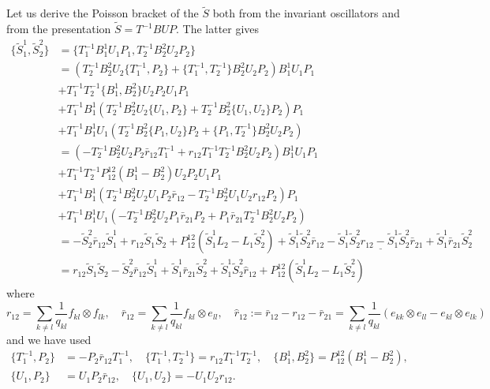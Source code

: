 \documentclass[11pt]{report}
\theoremstyle{definition}
\theoremstyle{remark}
\theoremstyle{remark}
\begin{document}
Let us derive the Poisson bracket of the $\tilde S$ both from the invariant oscillators and from the presentation $\tilde S = T^{-1}BUP$. The latter gives
\begin{align*}
\{ \tilde S_1^1, \tilde S_2^2 \}
&= \{ T_1^{-1} B_1^1 U_1 P_1, T_2^{-1} B_2^2 U_2 P_2 \} \\
&= (T_2^{-1} B_2^2 U_2 \{ T_1^{-1}, P_2 \} + \{ T_1^{-1}, T_2^{-1} \} B_2^2 U_2 P_2) B_1^1 U_1 P_1 \\
&+ T_1^{-1} T_2^{-1} \{ B_1^1, B_2^2 \} U_2 P_2 U_1 P_1 \\
&+ T_1^{-1} B_1^1 (T_2^{-1} B_2^2 U_2 \{ U_1, P_2 \} + T_2^{-1} B_2^2 \{ U_1, U_2 \} P_2) P_1 \\
&+ T_1^{-1} B_1^1 U_1 (T_2^{-1} B_2^2 \{ P_1, U_2 \} P_2 + \{ P_1, T_2^{-1} \} B_2^2 U_2 P_2) \\
&= (-T_2^{-1} B_2^2 U_2 P_2 \bar r_{12} T_1^{-1} + r_{12} T_1^{-1} T_2^{-1} B_2^2 U_2 P_2) B_1^1 U_1 P_1 \\
&+ T_1^{-1} T_2^{-1} P_{12}^{12} (B_1^1 - B_2^2) U_2 P_2 U_1 P_1 \\
&+ T_1^{-1} B_1^1 (T_2^{-1} B_2^2 U_2 U_1 P_2 \bar r_{12} - T_2^{-1} B_2^2 U_1 U_2 r_{12} P_2) P_1 \\
&+ T_1^{-1} B_1^1 U_1 (-T_2^{-1} B_2^2 U_2 P_1 \bar r_{21} P_2 + P_1 \bar r_{21} T_2^{-1} B_2^2 U_2 P_2) \\
&= - \tilde S_2^2 \bar r_{12} \tilde S_1^1 + r_{12} \tilde S_1 \tilde S_2 + P_{12}^{12} (\tilde S_1^1 L_2-L_1 \tilde S_2^2) + \underline{\tilde S_1^1 \tilde S_2^2 \bar r_{12} - \tilde S_1^1 \tilde S_2^2 r_{12} - \tilde S_1^1 \tilde S_2^2 \bar r_{21} + \tilde S_1^1 \bar r_{21} \tilde S_2^2} \\
&= r_{12} \tilde S_1 \tilde S_2 - \tilde S_2^2 \bar r_{12} \tilde S_1^1 + \tilde S_1^1 \bar r_{21} \tilde S_2^2 + \tilde S_1^1 \tilde S_2^2 \hat r_{12} + P_{12}^{12} (\tilde S_1^1 L_2-L_1 \tilde S_2^2)
\end{align*}
where
\begin{equation*}
r_{12} = \sum_{k \neq l} \frac{1}{q_{kl}} f_{kl} \otimes f_{lk}, \quad \bar r_{12} = \sum_{k \neq l} \frac{1}{q_{kl}} f_{kl} \otimes e_{ll}, \quad \hat r_{12} := \bar r_{12} - r_{12} - \bar r_{21} = \sum_{k \neq l} \frac{1}{q_{kl}} (e_{kk} \otimes e_{ll}-e_{kl} \otimes e_{lk})
\end{equation*}
and we have used
\begin{align*}
\{ T_1^{-1},P_2 \} &= -P_2 \bar r_{12} T_1^{-1}, \quad \{ T_1^{-1}, T_2^{-1} \} = r_{12} T_1^{-1} T_2^{-1}, \quad \{ B_1^1,B_2^2 \} = P_{12}^{12} (B_1^1-B_2^2), \\
\{ U_1,P_2 \} &= U_1 P_2 \bar r_{12}, \quad \{ U_1,U_2 \} = -U_1 U_2 r_{12}.
\end{align*}
\end{document}
